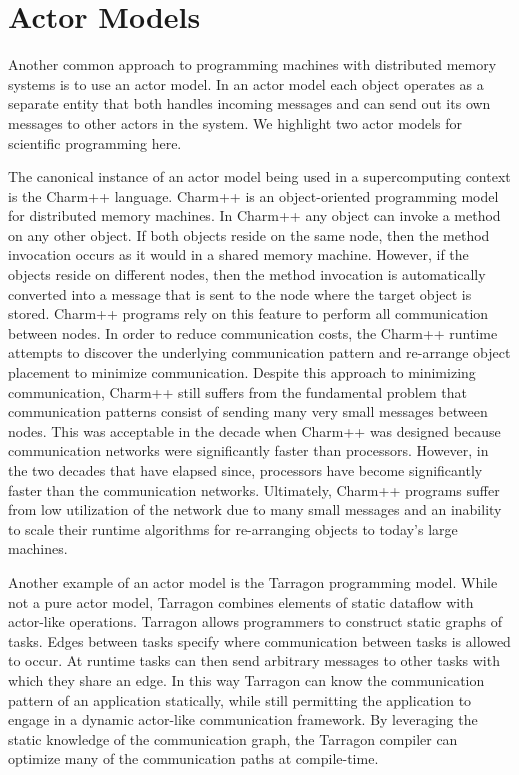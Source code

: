 \section{Actor Models}
\label{sec:actors}

Another common approach to programming machines
with distributed memory systems is to use an
actor model.  In an actor model each object
operates as a separate entity that both handles
incoming messages and can send out its own
messages to other actors in the system. We highlight
two actor models for scientific programming here.

The canonical instance of an actor model being
used in a supercomputing context is the Charm++
language\cite{Charm93}. Charm++ is an object-oriented
programming model for distributed memory machines.
In Charm++ any object can invoke a method on any
other object.  If both objects reside on the same
node, then the method invocation occurs as it
would in a shared memory machine.  However, if the
objects reside on different nodes, then the method
invocation is automatically converted into a message
that is sent to the node where the target object
is stored. Charm++ programs rely on this feature
to perform all communication between nodes. In order
to reduce communication costs, the Charm++ runtime
attempts to discover the underlying communication
pattern and re-arrange object placement to minimize
communication.  Despite this approach to minimizing
communication, Charm++ still suffers from the
fundamental problem that communication patterns 
consist of sending many very small messages between
nodes. This was acceptable in the decade when Charm++
was designed because communication networks were
significantly faster than processors.  However,
in the two decades that have elapsed since, processors
have become significantly faster than the communication
networks. Ultimately, Charm++ programs suffer from
low utilization of the network due to many small
messages and an inability to scale their runtime
algorithms for re-arranging objects to today's
large machines.

Another example of an actor model is the Tarragon
programming model\cite{Tarragon06}. While not a pure 
actor model, Tarragon combines elements of static 
dataflow with actor-like operations. Tarragon allows 
programmers to construct static graphs of tasks. Edges 
between tasks specify where communication between tasks is 
allowed to occur.  At runtime tasks can then send
arbitrary messages to other tasks with which they
share an edge. In this way Tarragon can know the
communication pattern of an application statically,
while still permitting the application to engage
in a dynamic actor-like communication framework.
By leveraging the static knowledge of the communication 
graph, the Tarragon compiler can optimize many of the
communication paths at compile-time.

